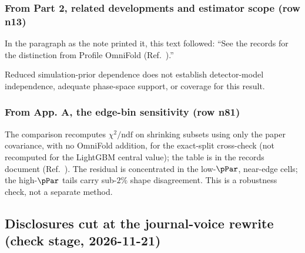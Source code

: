 \subsubsection{From Part 2, related developments and estimator scope (row n13)}
In the paragraph as the note printed it, this text followed: ``See the records for the distinction from Profile OmniFold (Ref.~\cite{NoteRecords2026}).''\par
Reduced simulation-prior dependence does not establish detector-model independence, adequate phase-space support, or coverage for this result.

\subsubsection{From App. A, the edge-bin sensitivity (row n81)}
The comparison recomputes $\chi^{2}/\mathrm{ndf}$ on shrinking subsets using only the paper covariance, with no OmniFold addition, for the exact-split cross-check (not recomputed for the LightGBM central value); the table is in the records document (Ref.~\cite{NoteRecords2026}).
The residual is concentrated in the low-$\pPar$, near-edge cells; the high-$\pPar$ tails carry sub-$2\%$ shape disagreement. This is a robustness check, not a separate method.

\subsection{Disclosures cut at the journal-voice rewrite (check stage, 2026-11-21)}

